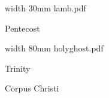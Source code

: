 
\eject


\bigskip


\eject


\bigskip



\bigskip

\saveimageresource width 30mm {lamb.pdf}

\centerline{\useimageresource \lastsavedimageresourceindex}



\bigskip

\eject


\paginaproxima

\beginpart Pentecost


\bigskip

\saveimageresource width 80mm {holyghost.pdf}

\centerline{\useimageresource \lastsavedimageresourceindex}



\bigskip

\eject


\paginaproxima

\beginpart Trinity



\paginaproxima

\beginpart Corpus Christi


\bigskip



\paginaproxima


\bigskip



